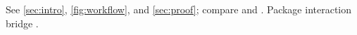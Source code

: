 \documentclass[unicode,paperfamily]{wrapper}
\begin{document}
\tableofcontents
\listoffigures
\wrapperclass\articleclass\layoutmode\hyperdriver\hyperxmploaded\shimready


See \cref{sec:intro}, \autoref{fig:workflow}, and \autoref{sec:proof}; compare \citeauthor{alpha} \citeyearpar{alpha} and \citep[see][pp.~1--2]{beta}.
Package interaction bridge \PackageInteractionLayer.
\end{document}
